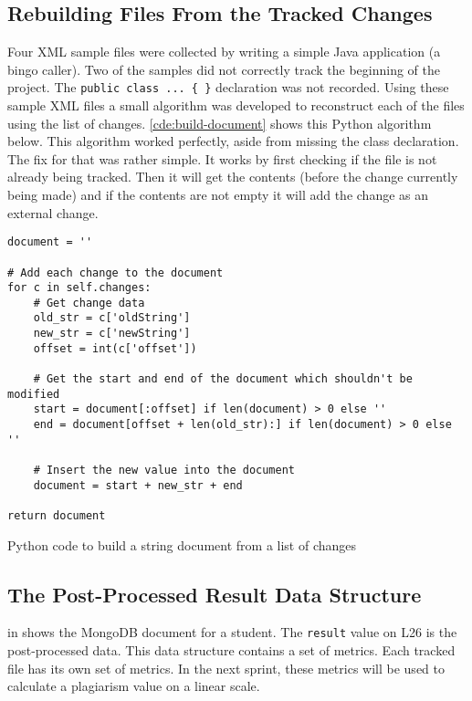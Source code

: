 \subsection{Rebuilding Files From the Tracked Changes}
Four XML sample files were collected by writing a simple Java application (a bingo caller). Two of the samples did not correctly track the beginning of the project. The \texttt{public class ... \{ \}} declaration was not recorded. Using these sample XML files a small algorithm was developed to reconstruct each of the files using the list of changes. \autoref{cde:build-document} shows this Python algorithm below. This algorithm worked perfectly, aside from missing the class declaration. The fix for that was rather simple. It works by first checking if the file is not already being tracked. Then it will get the contents (before the change currently being made) and if the contents are not empty it will add the change as an external change.

\begin{code}
\begin{verbatim}
document = ''

# Add each change to the document
for c in self.changes:
    # Get change data
    old_str = c['oldString']
    new_str = c['newString']
    offset = int(c['offset'])

    # Get the start and end of the document which shouldn't be modified
    start = document[:offset] if len(document) > 0 else ''
    end = document[offset + len(old_str):] if len(document) > 0 else ''

    # Insert the new value into the document
    document = start + new_str + end

return document
\end{verbatim}
\caption{Python code to build a string document from a list of changes}
\label{cde:build-document}
\end{code}

\subsection{The Post-Processed Result Data Structure}
 in  shows the MongoDB document for a student. The \texttt{result} value on L26 is the post-processed data. This data structure contains a set of metrics. Each tracked file has its own set of metrics. In the next sprint, these metrics will be used to calculate a plagiarism value on a linear scale.

